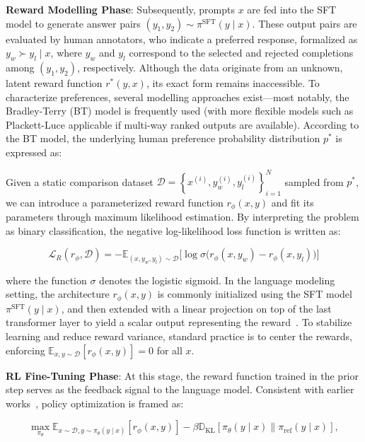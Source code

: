 \textbf{Reward Modelling Phase}: Subsequently, prompts $x$ are fed into the SFT model to generate answer pairs $(y_1, y_2)\sim \pi^\text{SFT}(y \mid x)$. These output pairs are evaluated by human annotators, who indicate a preferred response, formalized as $y_w\succ y_l \mid x$, where $y_w$ and $y_l$ correspond to the selected and rejected completions among $(y_1, y_2)$, respectively. Although the data originate from an unknown, latent reward function $r^*(y, x)$, its exact form remains inaccessible. To characterize preferences, several modelling approaches exist—most notably, the Bradley-Terry (BT) \cite{bradley1952rankanalysis} model is frequently used (with more flexible models such as Plackett-Luce \citep{plackett1975analysis, luce2012individual} applicable if multi-way ranked outputs are available). According to the BT model, the underlying human preference probability distribution $p^*$ is expressed as:

Given a static comparison dataset $\mathcal{D} = \left\{x^{(i)}, y_w^{(i)}, y_l^{(i)}\right\}_{i=1}^N$ sampled from $p^*$, we can introduce a parameterized reward function $r_{\phi}(x, y)$ and fit its parameters through maximum likelihood estimation. By interpreting the problem as binary classification, the negative log-likelihood loss function is written as:

\begin{equation}\label{eq:reward_model}
    \mathcal{L}_R(r_{\phi}, \mathcal{D}) = -\mathbb{E}_{(x, y_w, y_l)\sim \mathcal{D}}\Big[\log \sigma\big(r_{\phi}(x, y_w) - r_{\phi}(x, y_l)\big)\Big]
\end{equation}

where the function $\sigma$ denotes the logistic sigmoid. In the language modeling setting, the architecture $r_{\phi}(x, y)$ is commonly initialized using the SFT model $\pi^\text{SFT}(y \mid x)$, and then extended with a linear projection on top of the last transformer layer to yield a scalar output representing the reward~\cite{ziegler2020finetuning}. To stabilize learning and reduce reward variance, standard practice is to center the rewards, enforcing $\mathbb{E}_{x,y\sim \mathcal{D}}[r_\phi(x, y)] = 0$ for all $x$.

\textbf{RL Fine-Tuning Phase}: At this stage, the reward function trained in the prior step serves as the feedback signal to the language model. Consistent with earlier works~\citep{jaques2017sequence, jaques2020human}, policy optimization is framed as:

\begin{equation}\label{eq:RL}
\max_{\pi_{\theta}}  \mathbb{E}_{x\sim \mathcal{D}, y\sim \pi_{\theta}(y \mid x)}\left[r_{\phi}(x, y)\right] - \beta \mathbb{D}_{\textrm{KL}}\left[\pi_{\theta}(y \mid x) \| \pi_\text{ref}(y \mid x)\right],
\end{equation}

